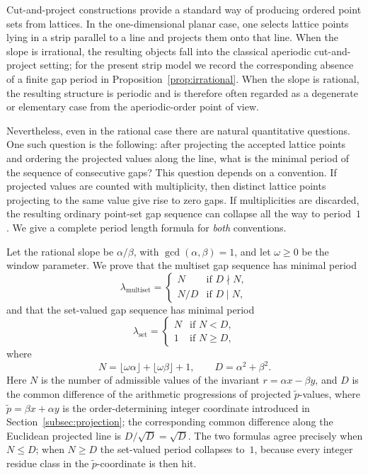 \documentclass[11pt,reqno]{amsart}
\theoremstyle{plain}
\theoremstyle{definition}
\theoremstyle{remark}
\begin{document}
Cut-and-project constructions provide a standard way of producing ordered
point sets from lattices.  In the one-dimensional planar case, one selects
lattice points lying in a strip parallel to a line and projects them onto
that line.  When the slope is irrational, the resulting objects fall into
the classical aperiodic cut-and-project setting; for the present strip
model we record the corresponding absence of a finite gap period in
Proposition~\ref{prop:irrational}.  When the slope is rational, the
resulting structure is periodic and is therefore often regarded as a
degenerate or elementary case from the aperiodic-order point of view.

Nevertheless, even in the rational case there are natural quantitative
questions.  One such question is the following: after projecting the accepted
lattice points and ordering the projected values along the line, what is the
minimal period of the sequence of consecutive gaps?  This question depends
on a convention.  If projected values are counted with multiplicity, then
distinct lattice points projecting to the same value give rise to zero gaps.
If multiplicities are discarded, the resulting ordinary point-set gap
sequence can collapse all the way to period~$1$.  We give a complete
period length formula for \emph{both} conventions.

Let the rational slope be \(\alpha/\beta\), with
\(\gcd(\alpha,\beta)=1\), and let \(\omega\ge0\) be the window parameter.
We prove that the multiset gap sequence has minimal period
\[
    \lambda_{\mathrm{multiset}} =
    \begin{cases}
        N   & \text{if } D \nmid N, \\
        N/D & \text{if } D \mid N,
    \end{cases}
\]
and that the set-valued gap sequence has minimal period
\[
    \lambda_{\mathrm{set}} =
    \begin{cases}
        N & \text{if } N < D, \\
        1 & \text{if } N \ge D,
    \end{cases}
\]
where
\[
    N=\lfloor\omega\alpha\rfloor+\lfloor\omega\beta\rfloor+1,
    \qquad
    D=\alpha^2+\beta^2.
\]
Here \(N\) is the number of admissible values of the invariant
\(r=\alpha x-\beta y\), and \(D\) is the common difference of the
arithmetic progressions of projected \(\tilde{p}\)-values, where
\(\tilde p = \beta x + \alpha y\) is the order-determining integer
coordinate introduced in Section~\ref{subsec:projection}; the
corresponding common difference along the Euclidean projected line is
\(D / \sqrt{D} = \sqrt{D}\).  The two formulas agree precisely
when \(N \le D\); when \(N \ge D\) the set-valued period collapses to~\(1\),
because every integer residue class in the \(\tilde{p}\)-coordinate is then
hit.
\end{document}
